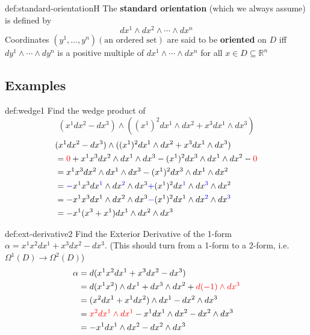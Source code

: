 \documentclass[landscape, 8pt]{extarticle}
\begin{document}
\begin{multicols}{3}
\begin{dfn}{def:standard-orientation}{H}
The \textbf{standard orientation} (which we always assume) is defined by
\[dx^{1} \wedge dx^{2}\wedge \cdots \wedge dx^{n}\]
Coordinates \((y^{1},\dots,y^{n})(\text{an ordered set})\) are said to be \textbf{oriented} on \(D\) iff \(dy^{1}\wedge \cdots \wedge dy^{n}\) is a positive multiple of \(dx^{1}\wedge \cdots \wedge dx^{n}\) for all \(x\in D \subseteq \mathbb{R}^{n}\)
\end{dfn}


\newpage 

\subsection*{Examples}

\begin{xmp}{def:wedge}{1}
Find the wedge product of 
\[(x^{1}dx^{2} - dx^{3}) \wedge ((x^{1})^{2}dx^{1}\wedge dx^{2} + x^{3}dx^{1}\wedge dx^{3})\]
\begin{align*}
   &(x^{1}dx^{2} - dx^{3}) \wedge ((x^{1})^{2}dx^{1}\wedge dx^{2} + x^{3}dx^{1}\wedge dx^{3}) \\
    &= \textcolor{red}{0} + x^{1}x^{3}dx^{2}\wedge dx^{1}\wedge dx^{3} - (x^{1})^{2}dx^{3}\wedge dx^{1}\wedge dx^{2} - \textcolor{red}{0} \\
    &= x^{1}x^{3}dx^{2}\wedge dx^{1}\wedge dx^{3} - (x^{1})^{2}dx^{3}\wedge dx^{1}\wedge dx^{2} \\
    &= \textcolor{blue}{-}x^{1}x^{3}dx^{\textcolor{blue}{1}}\wedge dx^{\textcolor{blue}{2}}\wedge dx^{3} \textcolor{blue}{+} (x^{1})^{2}dx^{\textcolor{blue}{1}}\wedge dx^{\textcolor{blue}{3}}\wedge dx^{2} \\
    &= -x^{1}x^{3}dx^{1}\wedge dx^{2}\wedge dx^{3} \textcolor{blue}{-} (x^{1})^{2}dx^{1}\wedge dx^{\textcolor{blue}{2}}\wedge dx^{\textcolor{blue}{3}} \\
    &= -x^{1}(x^{3} + x^{1} )dx^{1}\wedge dx^{2}\wedge dx^{3}
\end{align*}
\end{xmp}


\begin{xmp}{def:ext-derivative}{2}
Find the Exterior Derivative of the 1-form \(\alpha = x^{1}x^{2}dx^{1} + x^{3}dx^{2} - dx^{3}\). (This should turn from a 1-form to a 2-form, i.e. \(\Omega^{1}(D)\to \Omega^{2}(D)\))
\begin{align*}
    \alpha &= d(x^{1}x^{2}dx^{1} + x^{3}dx^{2} - dx^{3}) \\ 
    &= d(x^{1}x^{2})\wedge dx^{1} + dx^{3}\wedge dx^{2} + \textcolor{red}{d(-1)\wedge dx^{3}} \\
    &= (x^{2}dx^{1} + x^{1}dx^{2}) \wedge dx^{1} - dx^{2}\wedge dx^{3} \\
    &= \textcolor{red}{x^{2}dx^{1}\wedge dx^{1}}-x^{1}dx^{1}\wedge dx^{2} - dx^{2} \wedge dx^{3} \\
    &= -x^{1}dx^{1}\wedge dx^{2} - dx^{2} \wedge dx^{3} 
\end{align*}


\end{xmp}
\end{multicols}
\end{document}
